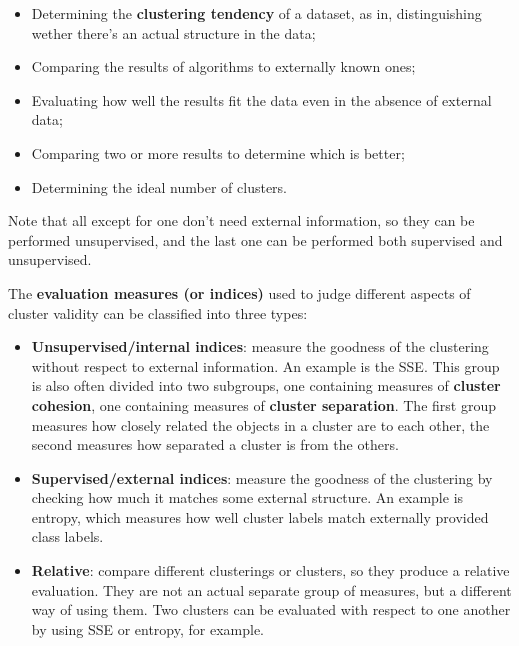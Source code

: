\begin{itemize}
    \item Determining the \textbf{clustering tendency} of a dataset, as in, distinguishing wether there's an actual structure in the data;

    \item Comparing the results of algorithms to externally known ones;

    \item Evaluating how well the results fit the data even in the absence of external data;

    \item Comparing two or more results to determine which is better;

    \item Determining the ideal number of clusters.
\end{itemize}

Note that all except for one don't need external information, so they can be performed unsupervised, and the last one can be performed both supervised and unsupervised.

The \textbf{evaluation measures (or indices)} used to judge different aspects of cluster validity can be classified into three types:

\begin{itemize}
    \item \textbf{Unsupervised/internal indices}: measure the goodness of the clustering without respect to external information. An example is the SSE.
    This group is also often divided into two subgroups, one containing measures of \textbf{cluster cohesion}, one containing measures of \textbf{cluster separation}. The first group measures how closely related the objects in a cluster are to each other, the second measures how separated a cluster is from the others.

    \item \textbf{Supervised/external indices}: measure the goodness of the clustering by checking how much it matches some external structure. An example is entropy, which measures how well cluster labels match externally provided class labels.

    \item \textbf{Relative}: compare different clusterings or clusters, so they produce a relative evaluation. They are not an actual separate group of measures, but a different way of using them. Two clusters can be evaluated with respect to one another by using SSE or entropy, for example.
\end{itemize}

